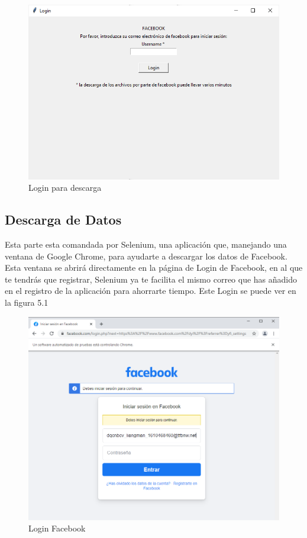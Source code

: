  \begin{figure}
	\begin{center}
		\includegraphics[scale=0.7]{Imagenes/Fuentes/PantallaLogin.png} 
		\caption{Login para descarga}
		\label{PantallaLogin}
	\end{center}
\end{figure}

\subsection{Descarga de Datos}

Esta parte esta comandada por Selenium, una aplicación que, manejando una ventana de Google Chrome, para ayudarte a descargar los datos de Facebook. Esta ventana se abrirá directamente en la página de Login de Facebook, en al que te tendrás que registrar, Selenium ya te facilita el mismo correo que has añadido en el registro de la aplicación para ahorrarte tiempo. Este Login se puede ver en la figura 5.1 

\begin{figure}
	\begin{center}
		\includegraphics[scale=0.5]{Imagenes/Fuentes/TutorialDescarga1.png} \caption{Login Facebook}
		\label{TutorialDescarga1}
	\end{center}
\end{figure}


